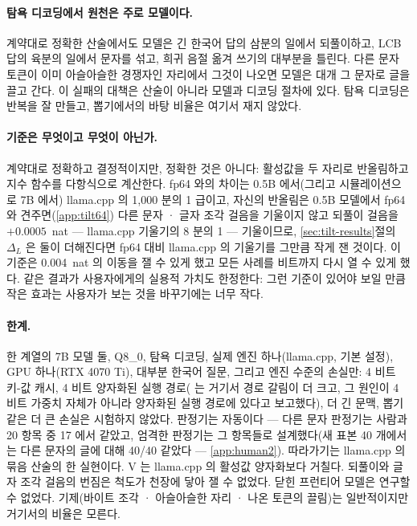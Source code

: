 \documentclass[11pt]{article}
\begin{document}
\paragraph{탐욕 디코딩에서 원천은 주로 모델이다.}
계약대로 정확한 산술에서도 모델은 긴 한국어 답의 삼분의 일에서 되풀이하고, LCB 답의 육분의 일에서 문자를 섞고, 희귀 음절 옮겨
쓰기의 대부분을 틀린다. 다른 문자 토큰이 이미 아슬아슬한 경쟁자인 자리에서 그것이 나오면 모델은 대개 그 문자로 글을 끌고 간다.
이 실패의 대책은 산술이 아니라 모델과 디코딩 절차에 있다. 탐욕 디코딩은 반복을 잘 만들고, 뽑기에서의 바탕 비율은 여기서 재지
않았다.

\paragraph{기준은 무엇이고 무엇이 아닌가.}
계약대로 정확하고 결정적이지만, 정확한 것은 아니다: 활성값을 두 자리로 반올림하고 지수 함수를 다항식으로 계산한다. fp64 와의
차이는 0.5B 에서(그리고 시뮬레이션으로 7B 에서) llama.cpp 의 1,000 분의 1 급이고, 자신의 반올림은 0.5B 모델에서 fp64 와
견주면(\ref{app:tilt64}) 다른 문자 · 글자 조각 걸음을 기울이지 않고 되풀이 걸음을 $+0.0005$~nat --- llama.cpp 기울기의 8 분의
1 --- 기울이므로, \ref{sec:tilt-results}절의 $\Delta_L$ 은 둘이 더해진다면 fp64 대비 llama.cpp 의 기울기를 그만큼 작게 잰 것이다.
이 기준은 0.004~nat 의 이동을 잴 수 있게 했고 모든 사례를 비트까지 다시 열 수 있게 했다. 같은
결과가 사용자에게의 실용적 가치도 한정한다: 그런 기준이 있어야 보일 만큼 작은 효과는 사용자가 보는 것을 바꾸기에는 너무 작다.

\paragraph{한계.}
한 계열의 7B 모델 둘, Q8\_0, 탐욕 디코딩, 실제 엔진 하나(llama.cpp, 기본 설정), GPU 하나(RTX 4070 Ti), 대부분 한국어 질문,
그리고 엔진 수준의 손실만: 4 비트 키-값 캐시, 4 비트 양자화된 실행 경로(\citet{patodiya2026} 는 거기서 경로 갈림이 더 크고,
그 원인이 4 비트 가중치 자체가 아니라 양자화된 실행 경로에 있다고 보고했다), 더 긴
문맥, 뽑기 같은 더 큰 손실은 시험하지 않았다. 판정기는 자동이다 --- 다른 문자 판정기는 사람과 20 항목 중 17 에서 같았고, 엄격한
판정기는 그 항목들로 설계했다(새 표본 40 개에서는 다른 문자의 글에 대해 40/40 같았다 --- \ref{app:human2}). 따라가기는 llama.cpp 의 묶음 산술의 한 실현이다. V 는 llama.cpp 의 활성값 양자화보다 거칠다.
되풀이와 글자 조각 걸음의 번짐은 척도가 천장에 닿아 잴 수 없었다. 닫힌 프런티어 모델은 연구할 수 없었다. 기제(바이트 조각 ·
아슬아슬한 자리 · 나온 토큰의 끌림)는 일반적이지만 거기서의 비율은 모른다.
\end{document}
